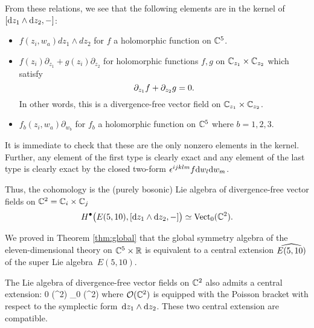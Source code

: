 From these relations, we see that the following elements are in the kernel of $[\d z_1 \wedge \d z_2, -]$:
\begin{itemize}
\item $f(z_i, w_a)dz_1\wedge dz_2$ for $f$ a holomorphic function on $\CC^5$.
\item $f(z_i) \partial_{z_1} + g(z_i) \partial_{z_2}$ for holomorphic functions $f,g$ on $\CC_{z_1} \times \CC_{z_2}$ which satisfy 
\[
\del_{z_1} f + \del_{z_2} g = 0 .
\]
In other words, this is a divergence-free vector field on $\CC_{z_1} \times \CC_{z_2}$. 
\item $f_b(z_i, w_a) \partial_{w_b}$ for $f_b$ a holomorphic function on $\CC^5$ where $b=1,2,3$. 
\end{itemize}
It is immediate to check that these are the only nonzero elements in the kernel. 
Further, any element of the first type is clearly exact and any element of the last type is clearly exact by the closed two-form $\ep^{ijklm} f \d w_l \d w_m$. 

Thus, the cohomology is the (purely bosonic) Lie algebra of divergence-free vector fields on $\CC^2 = \CC_i \times \CC_j$
\[
H^\bu\big(E(5,10), [\d z_1 \wedge \d z_2, -] \big) \simeq \Vect_0(\CC^2) .
\]

We proved in Theorem \ref{thm:global} that the global symmetry algebra of the eleven-dimensional theory on $\CC^5 \times \RR$ is equivalent to a central extension $\Hat{E(5,10)}$ of the super Lie algebra~$E(5,10)$. 

The Lie algebra of divergence-free vector fields on $\CC^2$ also admits a central extension:
\beqn\label{eqn:centralvect}
0 \to \CC \to \cO (\CC^2) \to \Vect_0 (\CC^2) 
\eeqn
where $\cO(\CC^2)$ is equipped with the Poisson bracket with respect to the symplectic form~$\d z_1 \wedge \d z_2$.
These two central extension are compatible. 


